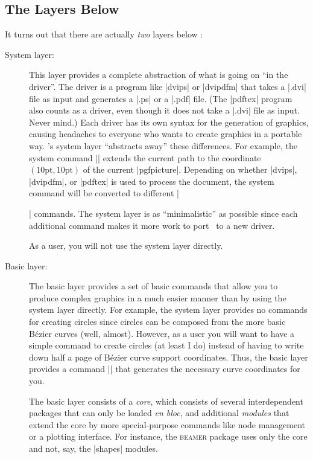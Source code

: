 \subsection{The Layers Below \tikzname}

It turns out that there are actually \emph{two} layers below \tikzname:
%
\begin{description}
    \item[System layer:] This layer provides a complete abstraction of what
        is going on ``in the driver''. The driver is a program like |dvips|
        or |dvipdfm| that takes a |.dvi| file as input and generates a |.ps|
        or a |.pdf| file. (The |pdftex| program also counts as a driver, even
        though it does not take a |.dvi| file as input. Never mind.) Each
        driver has its own syntax for the generation of graphics, causing
        headaches to everyone who wants to create graphics in a portable way.
        \pgfname's system layer ``abstracts away'' these differences. For
        example, the system command |\pgfsys@lineto{10pt}{10pt}| extends the
        current path  to the coordinate $(10\mathrm{pt},10\mathrm{pt})$ of
        the current |{pgfpicture}|. Depending on whether |dvips|, |dvipdfm|,
        or |pdftex| is used to process the document, the system command will
        be converted to different |\special| commands. The system layer is as
        ``minimalistic'' as possible since each additional command makes it
        more work to port \pgfname\ to a new driver.

        As a user, you will not use the system layer directly.
    \item[Basic layer:] The basic layer provides a set of basic commands that
        allow you to produce complex graphics in a much easier manner than by
        using the system layer directly. For example, the system layer provides
        no commands for creating circles since circles can be composed from the
        more basic Bézier curves (well, almost). However, as a user you will
        want to have a simple command to create circles (at least I do) instead
        of having to write down half a page of Bézier curve support
        coordinates. Thus, the basic layer provides a command |\pgfpathcircle|
        that generates the necessary curve coordinates for you.

        The basic layer consists of a \emph{core}, which consists of several
        interdependent packages that can only be loaded \emph{en bloc}, and
        additional \emph{modules} that extend the core by more
        special-purpose commands like node management or a plotting
        interface. For instance, the \textsc{beamer} package uses only the
        core and not, say, the |shapes| modules.
\end{description}

